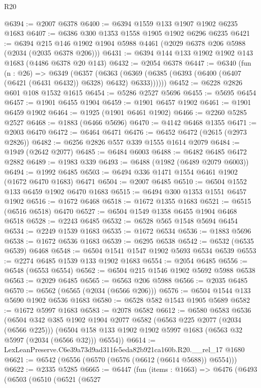 \begin{lexlean}{R20}
\begin{coremodule}
@6394 := @2007 @6378
@6400 := @6394 @1559 @133 @1907 @1902 @6235 @1683
@6407 := @6386 @300 @1353 @1558 @1905 @1902 @6296 @6235
@6421 := @6394 @215 @146 @1902 @1904 @5988 @4461 (@2029 @6378 @206 @5988 (@2034 (@2035 @6378 @206)))
@6431 := @6394 @144 @133 @1902 @1902 @143 @1683 (@4486 @6378 @20 @143)
@6432 := @2054 @6378
@6447 := @6340
    (fun (n : @26) =>
    @6349
      (@6357
        (@6363 (@6369 (@6385 (@6393 (@6400 (@6407 (@6421 (@6431 @6432)) @6328) @6432) @6333))))))
@6452 := @6228 @2826 @601 @108 @1532 @1615
@6454 := @5286 @2527 @5696
@6455 := @5695 @6454
@6457 := @1901 @6455 @1904
@6459 := @1901 @6457 @1902
@6461 := @1901 @6459 @1902
@6464 := @1925 (@1901 @6461 @1902)
@6466 := @2260 @5285 @2527
@6468 := @1883 (@6466 @5696)
@6470 := @4142 @6468 @1355
@6471 := @2003 @6470
@6472 := @6464 @6471
@6476 := @6452 @6472 (@2615 (@2973 @2826))
@6482 := @6256 @2826 @557 @339 @1555 @1614 @2079
@6484 := @1949 (@2642 @2077)
@6485 := @6484 @6003
@6488 := @6482 @6485 @6472 @2882
@6489 := @1983 @339
@6493 := @6488 (@1982 (@6489 @2079 @6003))
@6494 := @1992 @6485
@6503 := @6494 @336 @1471 @1554 @6461 @1902 (@1672 @6470 @1683) @6471
@6504 := @2007 @6485
@6510 := @6504 @1552 @133 @6459 @1902 @6470 @1683
@6515 := @6494 @300 @1353 @1551 @6457 @1902
@6516 := @1672 @6468
@6518 := @1672 @1355 @1683
@6521 := @6515 (@6516 @6518) @6470
@6527 := @6504 @1549 @1358 @6455 @1904 @6468 @6518
@6528 := @2243 @6485
@6532 := @6528 @565 @1548 @5694 @6454
@6534 := @2249 @1539 @1683
@6535 := @1672 @6534
@6536 := @1883 @5696
@6538 := @1672 @6536 @1683
@6539 := @6295 @6538
@6542 := @6532 (@6535 @6539) @6468
@6548 := @6504 @1541 @1547 @1902 @5693 @6534 @6539
@6553 := @2274 @6485 @1539 @133 @1902 @1683
@6554 := @2054 @6485
@6556 := @6548 (@6553 @6554)
@6562 := @6504 @215 @1546 @1902 @5692 @5988 @6538
@6563 := @2029 @6485
@6565 := @6563 @206 @5988
@6566 := @2035 @6485
@6570 := @6562 (@6565 (@2034 (@6566 @206)))
@6576 := @6504 @1544 @133 @5690 @1902 @6536 @1683
@6580 := @6528 @582 @1543 @1905 @5689
@6582 := @1672 @5997 @1683
@6583 := @2078 @6582
@6612 := @6580
    @6583
    @6536
    (@6504
      @342
      @385
      @1902
      @1904
      @2077
      @6582
      (@6563 @225 @2077 (@2034 (@6566 @225)))
      (@6504 @158 @133 @1902 @1902 @5997 @1683 (@6563 @32 @5997 (@2034 (@6566 @32))) @6554))
@6614 := LexLeanPreserve.C6e39a73d9ad311fe5eda82b921ca160b.R20.__rel_17 @1680
@6621 := @6542 (@6556 (@6570 (@6576 (@6612 (@6614 @5688)) @6554)))
@6622 := @2335 @5285
@6665 := @6447
    (fun (items : @1663) =>
    @6476
      (@6493
        (@6503
          (@6510
            (@6521
              (@6527

\end{coremodule}
\end{lexlean}
